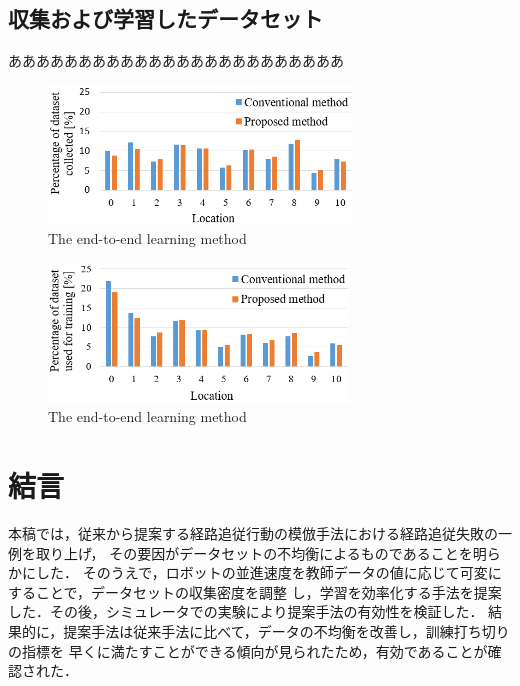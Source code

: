 \documentclass{jarticle}
\begin{document}
\subsection{収集および学習したデータセット}
ああああああああああああああああああああああああ


\begin{figure}[h!]
  \centering
   \includegraphics[height=37mm]{./png/dataset_pro2.png}
   \caption{The end-to-end learning method}
\end{figure}

\begin{figure}[h!]
  \centering
   \includegraphics[height=37mm]{./png/gaku_pro2.png}
   \caption{The end-to-end learning method}
\end{figure}

\newpage

\section{結言}
本稿では，従来から提案する経路追従行動の模倣手法における経路追従失敗の一例を取り上げ，
その要因がデータセットの不均衡によるものであることを明らかにした．
そのうえで，ロボットの並進速度を教師データの値に応じて可変にすることで，データセットの収集密度を調整
し，学習を効率化する手法を提案した．その後，シミュレータでの実験により提案手法の有効性を検証した．
結果的に，提案手法は従来手法に比べて，データの不均衡を改善し，訓練打ち切りの指標を
早くに満たすことができる傾向が見られたため，有効であることが確認された．\\
\end{document}
